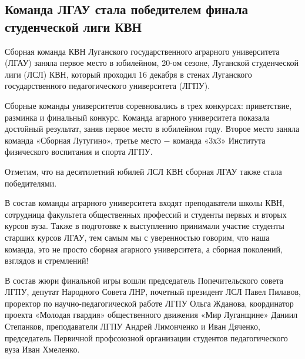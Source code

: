  
 
 
 
 
\subsection{Команда ЛГАУ стала победителем финала студенческой лиги КВН}
\label{sec:20_12_2021.stz.edu.lnr.lgau.1.kvn}



Сборная команда КВН Луганского государственного аграрного университета (ЛГАУ)
заняла первое место в юбилейном, 20-ом сезоне, Луганской студенческой лиги
(ЛСЛ) КВН, который проходил 16 декабря в стенах Луганского государственного
педагогического университета (ЛГПУ).


Сборные команды университетов соревновались в трех конкурсах: приветствие,
разминка и финальный конкурс. Команда агарного университета показала достойный
результат, заняв первое место в юбилейном году. Второе место заняла команда
«Сборная Лутугино», третье место − команда «3х3» Института физического
воспитания и спорта ЛГПУ.

Отметим, что на десятилетний юбилей ЛСЛ КВН сборная ЛГАУ также стала
победителями.


В состав команды аграрного университета входят преподаватели школы КВН,
сотрудница факультета общественных профессий и студенты первых и вторых курсов
вуза. Также в подготовке к выступлению принимали участие студенты старших
курсов ЛГАУ, тем самым мы с уверенностью говорим, что наша команда, это не
просто сборная агарного университета, а сборная поколений, взглядов и
стремлений!

В состав жюри финальной игры вошли председатель Попечительского совета ЛГПУ,
депутат Народного Совета ЛНР, почетный президент ЛСЛ Павел Пилавов, проректор
по научно-педагогической работе ЛГПУ Ольга Жданова, координатор проекта
«Молодая гвардия» общественного движения «Мир Луганщине» Даниил Степанков,
преподаватели ЛГПУ Андрей Лимонченко и Иван Дяченко, председатель Первичной
профсоюзной организации студентов педагогического вуза Иван Хмеленко.

